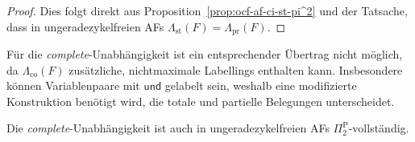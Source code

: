 \begin{proof}
    \label{pr:ocf-af-ci-pr-pi^2-c-is-correct}
    Dies folgt direkt aus Proposition~\ref{prop:ocf-af-ci-st-pi^2} und der Tatsache, dass in ungeradezykelfreien AFs \(\Lambda_{\mathrm{st}}(F)=\Lambda_{\mathrm{pr}}(F)\).
\end{proof}

Für die \emph{complete}-Unabhängigkeit ist ein entsprechender Übertrag nicht möglich, 
da \(\Lambda_{\mathrm{co}}(F)\) zusätzliche, nichtmaximale Labellings enthalten kann. 
Insbesondere können Variablenpaare mit \(\mathsf{und}\) gelabelt sein, weshalb eine 
modifizierte Konstruktion benötigt wird, die totale und partielle Belegungen unterscheidet.
\begin{Proposition}
    \label{prop:ocf-af-ci-co-pi^2-c}
    Die \emph{complete}-Unabhängigkeit ist auch in ungeradezykelfreien AFs \(\Pi_2^{\mathrm{P}}\)-vollständig.
\end{Proposition}

